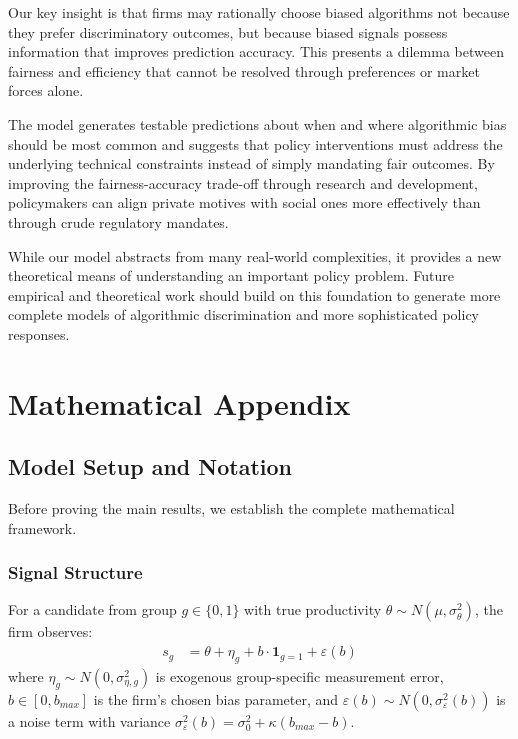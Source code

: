 \documentclass[12pt,a4paper]{article}
\theoremstyle{definition}
\theoremstyle{remark}
\begin{document}
Our key insight is that firms may rationally choose biased algorithms not because they prefer discriminatory outcomes, but because biased signals possess information that improves prediction accuracy. This presents a dilemma between fairness and efficiency that cannot be resolved through preferences or market forces alone.

The model generates testable predictions about when and where algorithmic bias should be most common and suggests that policy interventions must address the underlying technical constraints instead of simply mandating fair outcomes. By improving the fairness-accuracy trade-off through research and development, policymakers can align private motives with social ones more effectively than through crude regulatory mandates.

While our model abstracts from many real-world complexities, it provides a new theoretical means of understanding an important policy problem. Future empirical and theoretical work should build on this foundation to generate more complete models of algorithmic discrimination and more sophisticated policy responses.

\appendix

\section{Mathematical Appendix}

\subsection{Model Setup and Notation}

Before proving the main results, we establish the complete mathematical framework.

\subsubsection{Signal Structure}
For a candidate from group $g \in \{0,1\}$ with true productivity $\theta \sim N(\mu, \sigma_\theta^2)$, the firm observes:
\begin{align}
s_g &= \theta + \eta_g + b \cdot \mathbf{1}_{g=1} + \varepsilon(b)
\end{align}
where $\eta_g \sim N(0, \sigma_{\eta,g}^2)$ is exogenous group-specific measurement error, $b \in [0, b_{max}]$ is the firm's chosen bias parameter, and $\varepsilon(b) \sim N(0, \sigma_\varepsilon^2(b))$ is a noise term with variance $\sigma_\varepsilon^2(b) = \sigma_0^2 + \kappa(b_{max} - b)$.
\end{document}
